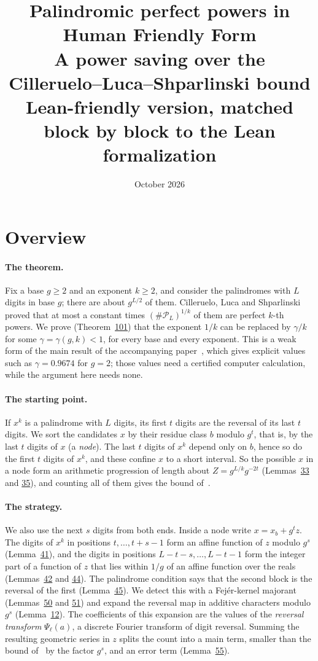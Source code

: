 \documentclass[11pt]{article}
\title{Palindromic perfect powers in Human Friendly Form\\[0.4em]\large A power saving over the Cilleruelo--Luca--Shparlinski bound\\[0.3em]\normalsize Lean-friendly version, matched block by block to the Lean formalization}
\author{}\date{October 2026}
\theoremstyle{definition}\newtheorem{hffdef}[hffc]{Definition}
\theoremstyle{plain}\newtheorem{hfflem}[hffc]{Lemma}\newtheorem{hffthm}[hffc]{Theorem}
\theoremstyle{remark}\newtheorem{hffrem}[hffc]{Remark}
\newcommand{\cP}{\mathcal{P}}\newcommand{\cQ}{\mathcal{Q}}\newcommand{\cB}{\mathcal{B}}\newcommand{\cT}{\mathcal{T}}
\begin{document}
\maketitle
\section*{Overview}
\paragraph{The theorem.} Fix a base $g\ge2$ and an exponent $k\ge2$, and consider the palindromes with $L$ digits in base $g$; there are about $g^{L/2}$ of them. Cilleruelo, Luca and Shparlinski~\cite{CLS} proved that at most a constant times $(\#\cP_L)^{1/k}$ of them are perfect $k$-th powers. We prove (Theorem~\hyperref[T:main]{101}) that the exponent $1/k$ can be replaced by $\gamma/k$ for some $\gamma=\gamma(g,k)<1$, for every base and every exponent. This is a weak form of the main result of the accompanying paper~\cite{Pal}, which gives explicit values such as $\gamma=0.9674$ for $g=2$; those values need a certified computer calculation, while the argument here needs none.

\paragraph{The starting point.} If $x^k$ is a palindrome with $L$ digits, its first $t$ digits are the reversal of its last $t$ digits. We sort the candidates $x$ by their residue class $b$ modulo $g^t$, that is, by the last $t$ digits of $x$ (a \emph{node}). The last $t$ digits of $x^k$ depend only on $b$, hence so do the first $t$ digits of $x^k$, and these confine $x$ to a short interval. So the possible $x$ in a node form an arithmetic progression of length about $Z=g^{L/k}g^{-2t}$ (Lemmas~\hyperref[L:tree]{33} and \hyperref[L:sizes]{35}), and counting all of them gives the bound of~\cite{CLS}.

\paragraph{The strategy.} We also use the next $s$ digits from both ends. Inside a node write $x=x_b+g^tz$. The digits of $x^k$ in positions $t,\dots,t+s-1$ form an affine function of $z$ modulo $g^s$ (Lemma~\hyperref[L:low]{41}), and the digits in positions $L-t-s,\dots,L-t-1$ form the integer part of a function of $z$ that lies within $1/g$ of an affine function over the reals (Lemmas~\hyperref[L:up]{42} and \hyperref[L:arch]{44}). The palindrome condition says that the second block is the reversal of the first (Lemma~\hyperref[L:local]{45}). We detect this with a Fej\'er-kernel majorant (Lemmas~\hyperref[L:majlarge]{50} and \hyperref[L:majcoef]{51}) and expand the reversal map in additive characters modulo $g^s$ (Lemma~\hyperref[L:fourier]{12}). The coefficients of this expansion are the values of the \emph{reversal transform} $\Psi_\ell(a)$, a discrete Fourier transform of digit reversal. Summing the resulting geometric series in $z$ splits the count into a main term, smaller than the bound of~\cite{CLS} by the factor $g^s$, and an error term (Lemma~\hyperref[L:red]{55}).
\end{document}
